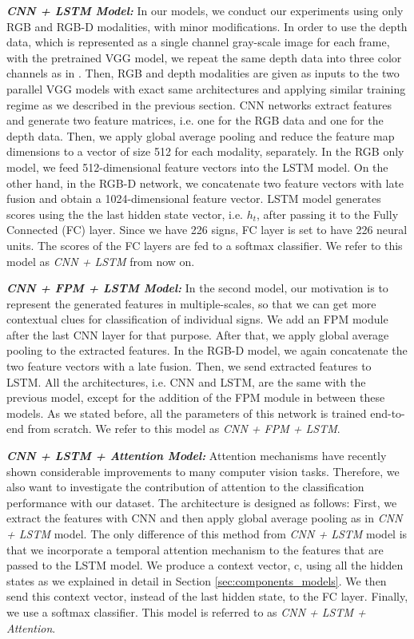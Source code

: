 \documentclass[11pt, a4paper, singlecolumn]{article}
\begin{document}
\textit{\textbf{CNN + LSTM Model: }} In our models, we conduct our experiments using only RGB and RGB-D modalities, with minor modifications. In order to use the depth data, which is represented as a single channel gray-scale image for each frame, with the pretrained VGG model, we repeat the same depth data into three color channels as in \cite{eitel2015multimodal}. Then, RGB and depth modalities are given as inputs to the two parallel VGG models with exact same architectures and applying similar training regime as we described in the previous section. CNN networks extract features and generate two feature matrices, i.e. one for the RGB data and one for the depth data. Then, we apply global average pooling and reduce the feature map dimensions to a vector of size 512 for each modality, separately. In the RGB only model, we feed 512-dimensional feature vectors into the LSTM model. On the other hand, in the RGB-D network, we concatenate two feature vectors with late fusion and obtain a 1024-dimensional feature vector. LSTM model generates scores using the the last hidden state vector, i.e. $h_t$, after passing it to the Fully Connected (FC) layer. Since we have 226 signs, FC layer is set to have 226 neural units. The scores of the FC layers are fed to a softmax classifier. We refer to this model as \textit{CNN + LSTM} from now on.

\textit{\textbf{CNN + FPM + LSTM Model: }} In the second model, our motivation is to represent the generated features in multiple-scales, so that we can get more contextual clues for classification of individual signs. We add an FPM module after the last CNN layer for that purpose. After that, we apply global average pooling to the extracted features. In the RGB-D model, we again concatenate the two feature vectors with a late fusion. Then, we send extracted features to LSTM. All the architectures, i.e. CNN and LSTM, are the same with the previous model, except for the addition of the FPM module in between these models. As we stated before, all the parameters of this network is trained end-to-end from scratch. We refer to this model as \textit{CNN + FPM + LSTM}.


\textit{\textbf{CNN + LSTM + Attention Model: }} Attention mechanisms have recently shown considerable improvements to many computer vision tasks. Therefore, we also want to investigate the contribution of attention to the classification performance with our dataset. The architecture is designed as follows: First, we extract the features with CNN and then apply global average pooling as in \textit{CNN + LSTM} model. The only difference of this method from \textit{CNN + LSTM} model is that we incorporate a temporal attention mechanism to the features that are passed to the LSTM model. We produce a context vector, c, using all the hidden states as we explained in detail in Section \ref{sec:components_models}. We then send this context vector, instead of the last hidden state, to the FC layer. Finally, we use a softmax classifier. This model is referred to as \textit{CNN + LSTM + Attention}.
\end{document}
